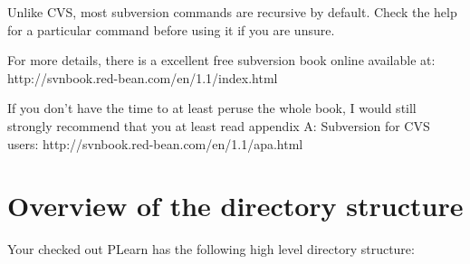 \documentclass[11pt]{book}
\begin{document}
Unlike CVS, most subversion commands are recursive by default. Check the
help for a particular command before using it if you are unsure.

For more details, there is a excellent free subversion book online available at:
http://svnbook.red-bean.com/en/1.1/index.html

If you don't have the time to at least peruse the whole book, I would still
strongly recommend that you at least read appendix A: Subversion for CVS
users: http://svnbook.red-bean.com/en/1.1/apa.html


\section{Overview of the directory structure}

Your checked out PLearn has the following high level directory structure:
\end{document}
